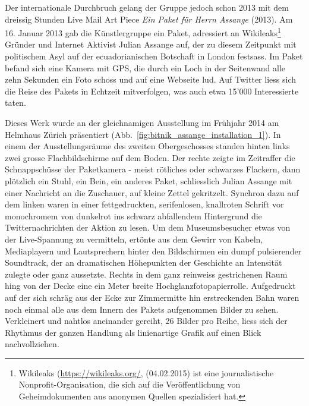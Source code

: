 \documentclass[
paper=164mm:234mm, %
pagesize, %
DIV=calc, %
10pt, %
BCOR=0mm, %
parskip=half- %
]{scrbook}
\begin{document}
Der internationale Durchbruch gelang der Gruppe jedoch schon 2013 mit dem dreissig Stunden Live Mail Art Piece \emph{Ein Paket für Herrn Assange} (2013). Am 16. Januar 2013 gab die Künstlergruppe ein Paket, adressiert an Wikileaks\footnote{Wikileaks (\url{https://wikileaks.org/}, (04.02.2015) ist eine journalistische Nonprofit-Organisation, die sich auf die Veröffentlichung von Geheimdokumenten aus anonymen Quellen spezialisiert hat.} Gründer und Internet Aktivist Julian Assange auf, der zu diesem Zeitpunkt mit politischem Asyl auf der ecuadorianischen Botschaft in London festsass. Im Paket befand sich eine Kamera mit GPS, die durch ein Loch in der Seitenwand alle zehn Sekunden ein Foto schoss und auf eine Webseite lud. Auf Twitter liess sich die Reise des Pakets in Echtzeit mitverfolgen, was auch etwa 15'000 Interessierte taten.

Dieses Werk wurde an der gleichnamigen Ausstellung im Frühjahr 2014 am Helmhaus Zürich präsentiert (Abb.~\ref{fig:bitnik_assange_installation_1}). In einem der Ausstellungsräume des zweiten Obergeschosses standen hinten links zwei grosse Flachbildschirme auf dem Boden. Der rechte zeigte im Zeitraffer die Schnappschüsse der Paketkamera - meist rötliches oder schwarzes Flackern, dann plötzlich ein Stuhl, ein Bein, ein anderes Paket, schliesslich Julian Assange mit einer Nachricht an die Zuschauer, auf kleine Zettel gekritzelt. Synchron dazu auf dem linken waren in einer fettgedruckten, serifenlosen, knallroten Schrift vor monochromem von dunkelrot ins schwarz abfallendem Hintergrund die Twitternachrichten der Aktion zu lesen. Um dem Museumsbesucher etwas von der Live-Spannung zu vermitteln, ertönte aus dem Gewirr von Kabeln, Mediaplayern und Lautsprechern hinter den Bildschirmen ein dumpf pulsierender Soundtrack, der an dramatischen Höhepunkten der Geschichte an Intensität zulegte oder ganz aussetzte.
Rechts in dem ganz reinweiss gestrichenen Raum hing von der Decke eine ein Meter breite Hochglanzfotopapierrolle. Aufgedruckt auf der sich schräg aus der Ecke zur Zimmermitte hin erstreckenden Bahn waren noch einmal alle aus dem Innern des Pakets aufgenommen Bilder zu sehen. Verkleinert und nahtlos aneinander gereiht, 26 Bilder pro Reihe, liess sich der Rhythmus der ganzen Handlung als linienartige Grafik auf einen Blick nachvollziehen.
\end{document}
